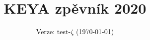 \documentclass[twoside,12pt,a5paper]{article}
\title{KEYA zpěvník 2020}
\date{Verze: test-$\zeta$ (\today)}
\begin{document}
\maketitle
\clearpage
\begin{multicols}{2}
\begin{footnotesize}
\tableofcontents{}
\end{footnotesize}
\end{multicols}
\clearpage

\end{document}
